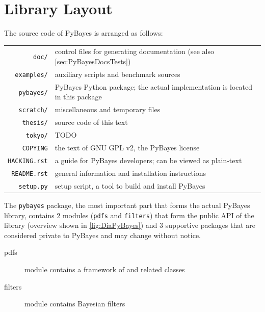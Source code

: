 \section{Library Layout}

The source code of PyBayes is arranged as follows:

\noindent\begin{tabular}{rp{\textwidth-92pt}}
\verb|doc/|      & control files for generating documentation (see also \autoref{sec:PyBayesDocsTests}) \\
\verb|examples/| & auxiliary scripts and benchmark sources \\
\verb|pybayes/|  & PyBayes Python package; the actual implementation is located in this package \\
\verb|scratch/|  & miscellaneous and temporary files \\
\verb|thesis/|   & source code of this text \\
\verb|tokyo/|    & TODO \\
\verb|COPYING|   & the text of GNU GPL v2, the PyBayes license \\
\verb|HACKING.rst| & a guide for PyBayes developers; can be viewed as plain-text \\
\verb|README.rst|  & general information and installation instructions \\
\verb|setup.py|    & setup script, a tool to build and install PyBayes \\
\end{tabular}

The \verb|pybayes| package, the most important part that forms the actual PyBayes library, contains
2 modules (\verb|pdfs| and \verb|filters|) that form the public API of the library (overview shown in
\autoref{fig:DiaPyBayes}) and 3 supportive packages that are considered private to PyBayes and may
change without notice.
\begin{description}
	\item[pdfs] module contains a framework of {\pdfs} and related classes
	\item[filters] module contains Bayesian filters
\end{description}

